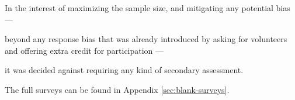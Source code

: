     In the interest of maximizing the sample size, and mitigating any potential bias ---%



 beyond any response bias that was already introduced by asking for volunteers and offering extra credit for participation ---%



 it was decided against requiring any kind of secondary assessment. 







    The full surveys can be found in Appendix \ref{sec:blank-surveys}.











